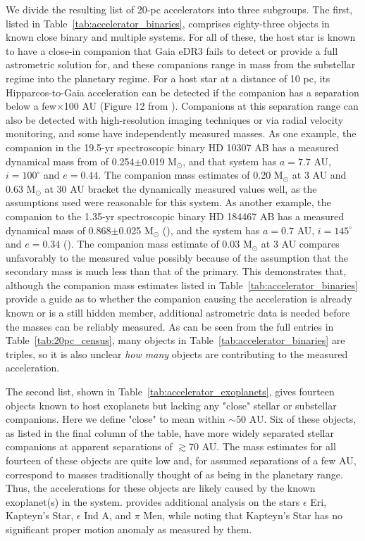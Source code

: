 \documentclass[twocolumn,tighten,twocolappendix]{aastex631}
\begin{document}
We divide the resulting list of 20-pc accelerators into three subgroups. The first, listed in Table~\ref{tab:accelerator_binaries}, comprises eighty-three objects in known close binary and multiple systems. For all of these, the host star is known to have a close-in companion that Gaia eDR3 fails to detect or provide a full astrometric solution for, and these companions range in mass from the substellar regime into the planetary regime. For a host star at a distance of 10 pc, its Hipparcos-to-Gaia acceleration can be detected if the companion has a separation below a few$\times$100 AU (Figure 12 from \citealt{kervella2022}). Companions at this separation range can also be detected with high-resolution imaging techniques or via radial velocity monitoring, and some have independently measured masses. As one example, the companion in the 19.5-yr spectroscopic binary HD 10307 AB has a measured dynamical mass from \cite{torres2022} of 0.254$\pm$0.019 M$_\odot$, and that system has $a = 7.7$ AU, $i = 100^\circ$ and $e = 0.44$. The \cite{kervella2022} companion mass estimates of 0.20 M$_\odot$ at 3 AU and 0.63 M$_\odot$ at 30 AU bracket the dynamically measured values well, as the assumptions used were reasonable for this system. As another example, the companion to the 1.35-yr spectroscopic binary HD 184467 AB has a measured dynamical mass of 0.868$\pm$0.025 M$_\odot$ (\citealt{piccotti2020}), and the system has $a = 0.7$ AU, $i = 145^\circ$ and $e = 0.34$ (\citealt{arenou2000}). The \cite{kervella2022} companion mass estimate of 0.03 M$_\odot$ at 3 AU compares unfavorably to the measured value possibly because of the \cite{kervella2022} assumption that the secondary mass is much less than that of the primary. This demonstrates that, although the \cite{kervella2022} companion mass estimates listed in Table~\ref{tab:accelerator_binaries} provide a guide as to whether the companion causing the acceleration is already known or is a still hidden member, additional astrometric data is needed before the masses can be reliably measured. As can be seen from the full entries in Table~\ref{tab:20pc_census}, many objects in Table~\ref{tab:accelerator_binaries} are triples, so it is also unclear {\it how many} objects are contributing to the measured acceleration.

The second list, shown in Table~\ref{tab:accelerator_exoplanets}, gives fourteen objects known to host exoplanets but lacking any "close" stellar or substellar companions. Here we define "close" to mean within $\sim$50 AU. Six of these objects, as listed in the final column of the table, have more widely separated stellar companions at apparent separations of $\gtrsim$70 AU. The \cite{kervella2022} mass estimates for all fourteen of these objects are quite low and, for assumed separations of a few AU, correspond to masses traditionally thought of as being in the planetary range. Thus, the accelerations for these objects are likely caused by the known exoplanet(s) in the system.  \cite{kervella2022} provides additional analysis on the stars $\epsilon$ Eri, Kapteyn's Star, $\epsilon$ Ind A, and $\pi$ Men, while noting that Kapteyn's Star has no significant proper motion anomaly as measured by them.
\end{document}
